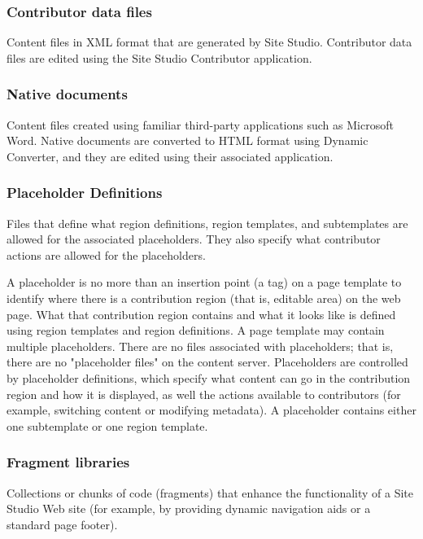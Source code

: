 \subsubsection{Contributor data files}

Content files in XML format that are generated by Site
Studio. Contributor data files are edited using the Site Studio
Contributor application.

\subsubsection{Native documents}

Content files created using familiar third-party applications such as
Microsoft Word. Native documents are converted to HTML format using
Dynamic Converter, and they are edited using their associated
application.

\subsubsection{Placeholder Definitions}

Files that define what region definitions, region templates, and
subtemplates are allowed for the associated placeholders. They also
specify what contributor actions are allowed for the placeholders.

A placeholder is no more than an insertion point (a tag) on a page
template to identify where there is a contribution region (that is,
editable area) on the web page. What that contribution region contains
and what it looks like is defined using region templates and region
definitions. A page template may contain multiple placeholders. There
are no files associated with placeholders; that is, there are no
"placeholder files" on the content server. Placeholders are controlled
by placeholder definitions, which specify what content can go in the
contribution region and how it is displayed, as well the actions
available to contributors (for example, switching content or modifying
metadata). A placeholder contains either one subtemplate or one region
template.


\subsubsection{Fragment libraries}

Collections or chunks of code (fragments) that enhance the
functionality of a Site Studio Web site (for example, by providing
dynamic navigation aids or a standard page footer).

